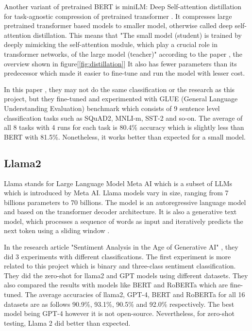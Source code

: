 Another variant of pretrained BERT is miniLM: Deep Self-attention distillation for task-agnostic compression of pretrained transformer \cite{Wang_Wei_Dong_Bao_Yang_Zhou_2020}.
It compresses large pretrained transformer based models to smaller model, otherwise called deep self-attention distillation. This means that "The small model (student) is trained by deeply mimicking the self-attention module, which play a crucial role in transformer networks, of the large model (teacher)" according to the paper \cite{Wang_Wei_Dong_Bao_Yang_Zhou_2020}, the overview shown in figure[\ref{fig:distillation}]
It also has fewer parameters than its predecessor which made it easier to fine-tune and run the model with lesser cost. 

In this paper \cite{Wang_Wei_Dong_Bao_Yang_Zhou_2020}, they may not do the same classification or the research as this project, but they fine-tuned and experimented with GLUE (General Language Understanding Evaluation) benchmark which consists of 9 sentence level classification tasks such as SQuAD2, MNLI-m, SST-2 and so-on. The average of all 8 tasks with 4 runs for each task is 80.4\% accuracy which is slightly less than BERT with 81.5\%. Nonetheless, it works better than expected for a small model.

\subsection{Llama2}
Llama stands for Large Language Model Meta AI which is a subset of LLMs which is introduced by Meta AI. Llama models vary in size, ranging from 7 billions parameters to 70 billions. The model is an autoregressive language model and based on the transformer decoder architecture. It is also a generative text model, which processes a sequence of words as input and iteratively predicts the next token using a sliding window \cite{Iraqi_2023}.

In the research article "Sentiment Analysis in the Age of Generative AI" \cite{Krugmann_Hartmann_2024}, they did 3 experiments with different classifications. The first experiment is more related to this project which is binary and three-class sentiment classification. They did the zero-shot for llama2 and GPT models using different datasets. They also compared the results with models like BERT and RoBERTa which are fine-tuned. The average accuracies of llama2, GPT-4, BERT and RoBERTa for all 16 datasets are as follows 90.9\%, 93.1\%, 90.5\% and 92.0\% respectively. The best model being GPT-4 however it is not open-source. Nevertheless, for zero-shot testing, Llama 2 did better than expected.

